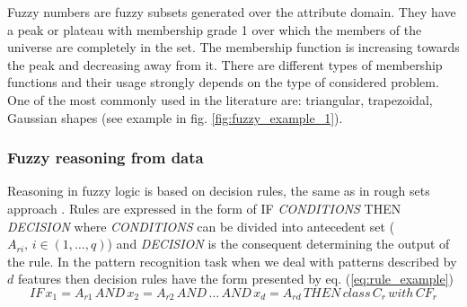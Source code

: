 Fuzzy numbers are fuzzy subsets generated over the attribute domain. 
They have a peak or plateau with membership grade 1 over which the 
members of the universe are completely in the set.  The membership 
function is increasing towards the peak and decreasing away from it. 
There are different types of membership functions and their usage 
strongly depends on the type of considered problem. One of the most 
commonly used in the literature are: triangular, trapezoidal, Gaussian shapes
(see example in fig. \ref{fig:fuzzy_example_1}).

\subsubsection{Fuzzy reasoning from data }
Reasoning in fuzzy logic is based on decision rules, the same as in rough sets
approach \cite{bib11}. 
Rules are expressed in the form of IF \textit{CONDITIONS} THEN \textit{DECISION}
where \textit{CONDITIONS} can be divided into antecedent set ($A_{ri}, \, i \in
(1, \ldots, q)$) and \textit{DECISION} is the consequent determining the
output of the rule. In the pattern recognition task when we deal with patterns
described by $d$ features then decision rules have the form presented by eq. (\ref{eq:rule_example})
\begin{equation}
    IF\, x_1=A_{r1}\, AND\, x_2=A_{r2}\, AND\, \ldots\, AND\, x_d=A_{rd}\, THEN\,
class\, C_r\, with \, CF_r
    \label{eq:rule_example}
\end{equation}

